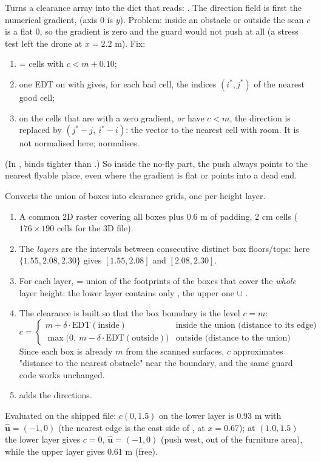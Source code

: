 Turns a clearance array into the dict that  reads:
. The direction field is first the numerical gradient,
 (axis 0 is $y$). Problem: inside an obstacle or outside the scan $c$ is a flat 0,
so the gradient is zero and the guard would not push at all (a stress test left the drone at $x=2.2$ m). Fix:
\begin{enumerate}[itemsep=1pt]
\item {} = cells with $c < m + 0.10$;
\item one EDT on  with  gives, for each bad cell, the indices $(i^\ast, j^\ast)$
of the nearest good cell;
\item on the cells that are  with a zero gradient, \emph{or} have $c<m$, the direction is replaced by
$(j^\ast-j,\ i^\ast-i)$: the vector to the nearest cell with room. It is not normalised here;
 normalises.
\end{enumerate}
(In , \code{\&} binds tighter than \code{|}.) So inside the no-fly part,
the push always points to the nearest flyable place, even where the gradient is flat or points into a dead end.

Converts the union of boxes into clearance grids, one per height layer.
\begin{enumerate}[itemsep=1pt]
\item A common 2D raster covering all boxes plus 0.6 m of padding, 2 cm cells ($176\times190$ cells for the 3D
file).
\item The \emph{layers} are the intervals between consecutive distinct box floors/tops: here
$\{1.55, 2.08, 2.30\}$ gives $[1.55, 2.08]$ and $[2.08, 2.30]$.
\item For each layer,  = union of the footprints of the boxes that cover the \emph{whole} layer
height: the lower layer contains only , the upper one  $\cup$ .
\item The clearance is built so that the box boundary is the level $c=m$:
$$
c = \begin{cases}
m + \delta\cdot\mathrm{EDT}(\text{inside}) & \text{inside the union (distance to its edge)}\\
\max\big(0,\ m - \delta\cdot\mathrm{EDT}(\text{outside})\big) & \text{outside (distance to the union)}
\end{cases}
$$
Since each box is already $m$ from the scanned surfaces, $c$ approximates "distance to the nearest obstacle"
near the boundary, and the same guard code works unchanged.
\item {} adds the directions.
\end{enumerate}
Evaluated on the shipped file: $c(0, 1.5)$ on the lower layer is 0.93 m with $\hat{\bm u}=(-1,0)$ (the nearest
edge is the east side of , at $x=0.67$); at $(1.0, 1.5)$ the lower layer gives $c=0$,
$\hat{\bm u}=(-1,0)$ (push west, out of the furniture area), while the upper layer gives 0.61 m (free).

